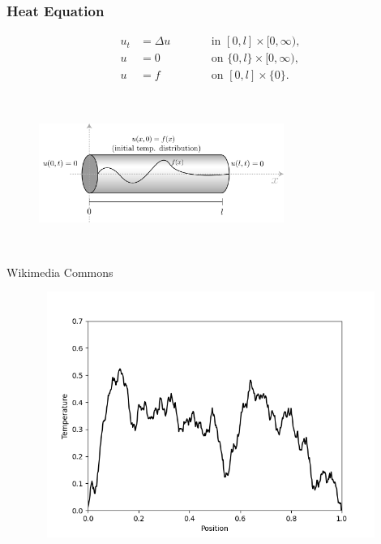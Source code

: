 \documentclass{beamer}
\begin{document}
\begin{frame}
\frametitle{Heat Equation}
\begin{subequations}
  \begin{align*}
    u_t &= \Delta u &&\qquad \text{in } [0,l] \times [0,\infty),\\
    u &= 0 &&\qquad \text{on } \{0, l\} \times [0,\infty),\\
    u &= f &&\qquad \text{on }[0,l] \times \{0\}.
  \end{align*}
\end{subequations}

\begin{figure}
  \centering
  \includegraphics[width=8cm,height=5cm]{figs/heat_rod.png} 
\end{figure}

{\hfill \tiny Wikimedia Commons}
\end{frame}


\begin{frame}
  \begin{figure}
    \centering
    \href{run:figs/forward_heat_equation.mp4}{\includegraphics[width=12cm,height=8cm]{figs/forward_heat_equation.png}}    
    
  \end{figure}
\end{frame}
\end{document}

